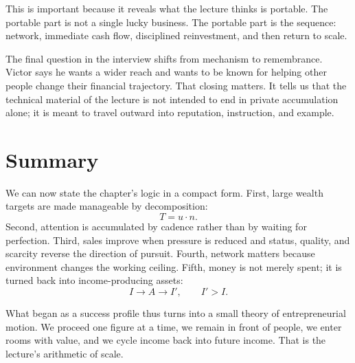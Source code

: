 This is important because it reveals what the lecture thinks is portable. The portable part is not a single lucky business. The portable part is the sequence: network, immediate cash flow, disciplined reinvestment, and then return to scale.

The final question in the interview shifts from mechanism to remembrance. Victor says he wants a wider reach and wants to be known for helping other people change their financial trajectory. That closing matters. It tells us that the technical material of the lecture is not intended to end in private accumulation alone; it is meant to travel outward into reputation, instruction, and example.

\section{Summary}

We can now state the chapter's logic in a compact form. First, large wealth targets are made manageable by decomposition:
\[
T = u \cdot n.
\]
Second, attention is accumulated by cadence rather than by waiting for perfection. Third, sales improve when pressure is reduced and status, quality, and scarcity reverse the direction of pursuit. Fourth, network matters because environment changes the working ceiling. Fifth, money is not merely spent; it is turned back into income-producing assets:
\[
I \to A \to I', \qquad I' > I.
\]

What began as a success profile thus turns into a small theory of entrepreneurial motion. We proceed one figure at a time, we remain in front of people, we enter rooms with value, and we cycle income back into future income. That is the lecture's arithmetic of scale.